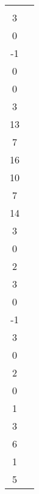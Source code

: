 \begin{applicationActivities}
\begin{activity}{15}
\begin{tabular}{cc}
    \(\left\{
    \begin{bmatrix}2\\3\\0\\-1\end{bmatrix},
    \begin{bmatrix}2\\0\\0\\3\end{bmatrix},
    \begin{bmatrix}3\\13\\7\\16\end{bmatrix},
    \begin{bmatrix}-1\\10\\7\\14\end{bmatrix},
    \begin{bmatrix}4\\3\\0\\2\end{bmatrix}
    \right\}
    \) &

	\(\left\{
    \begin{bmatrix}2\\3\\0\\-1\end{bmatrix},
    \begin{bmatrix}4\\3\\0\\2\end{bmatrix},
    \begin{bmatrix}-3\\0\\1\\3\end{bmatrix},
    \begin{bmatrix}3\\6\\1\\5\end{bmatrix}
    \right\}
    \) \\


\end{tabular}
\end{activity}
\end{applicationActivities}
